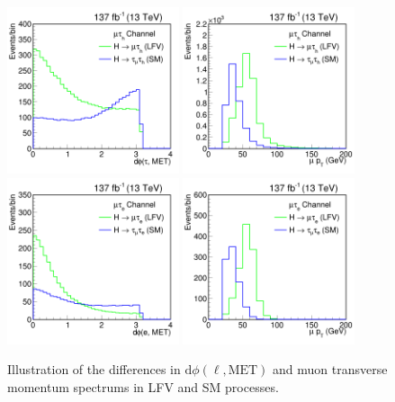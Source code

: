 \begin{figure}[htbp]
  \centering
  \includegraphics[width=0.45\textwidth]{plots/chapter6/LFVvSM/MTdphi.png}
  \includegraphics[width=0.45\textwidth]{plots/chapter6/LFVvSM/MTmpt.png} \\
  \includegraphics[width=0.45\textwidth]{plots/chapter6/LFVvSM/MEdphi.png}
  \includegraphics[width=0.45\textwidth]{plots/chapter6/LFVvSM/MEmpt.png} \\
  \caption{Illustration of the differences in $\text{d}\phi(\ell, \text{MET})$ and muon transverse momentum spectrums in LFV and SM \Htt processes.}
  \label{fig:htt_v_lfv_mt}
\end{figure}

